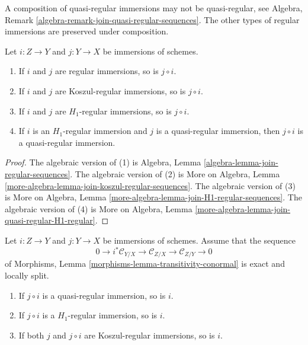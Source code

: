 \noindent
A composition of quasi-regular immersions may not be quasi-regular, see
Algebra, Remark \ref{algebra-remark-join-quasi-regular-sequences}.
The other types of regular immersions are preserved under composition.

\begin{lemma}
\label{lemma-composition-regular-immersion}
Let $i : Z \to Y$ and $j : Y \to X$ be immersions of schemes.
\begin{enumerate}
\item If $i$ and $j$ are regular immersions, so is $j \circ i$.
\item If $i$ and $j$ are Koszul-regular immersions, so is $j \circ i$.
\item If $i$ and $j$ are $H_1$-regular immersions, so is $j \circ i$.
\item If $i$ is an $H_1$-regular immersion and $j$ is a quasi-regular
immersion, then $j \circ i$ is a quasi-regular immersion.
\end{enumerate}
\end{lemma}

\begin{proof}
The algebraic version of (1) is
Algebra, Lemma \ref{algebra-lemma-join-regular-sequences}.
The algebraic version of (2) is
More on Algebra, Lemma \ref{more-algebra-lemma-join-koszul-regular-sequences}.
The algebraic version of (3) is
More on Algebra, Lemma \ref{more-algebra-lemma-join-H1-regular-sequences}.
The algebraic version of (4) is
More on Algebra, Lemma \ref{more-algebra-lemma-join-quasi-regular-H1-regular}.
\end{proof}

\begin{lemma}
\label{lemma-permanence-regular-immersion}
Let $i : Z \to Y$ and $j : Y \to X$ be immersions of schemes. Assume
that the sequence
$$
0 \to i^*\mathcal{C}_{Y/X} \to
\mathcal{C}_{Z/X} \to
\mathcal{C}_{Z/Y} \to 0
$$
of
Morphisms, Lemma \ref{morphisms-lemma-transitivity-conormal}
is exact and locally split.
\begin{enumerate}
\item If $j \circ i$ is a quasi-regular immersion, so is $i$.
\item If $j \circ i$ is a $H_1$-regular immersion, so is $i$.
\item If both $j$ and $j \circ i$ are Koszul-regular immersions, so is $i$.
\end{enumerate}
\end{lemma}

